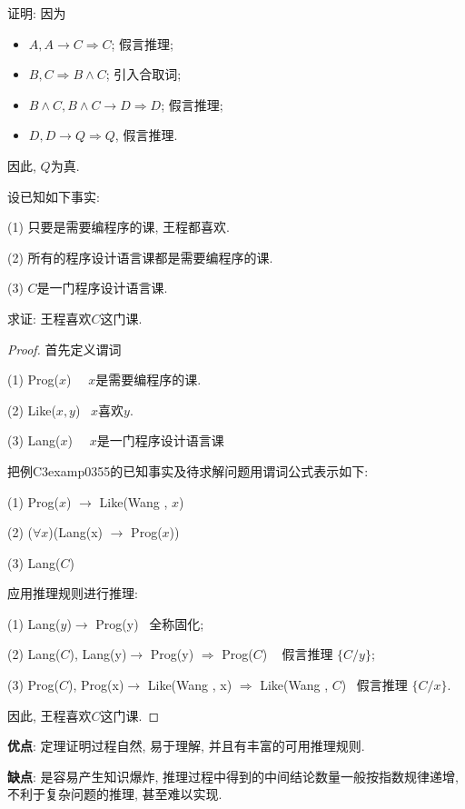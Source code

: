 证明: 因为
\begin{itemize}
    \item $A, A\rightarrow C\Rightarrow  C$;                    假言推理;
    \item $B,  C\Rightarrow  B\wedge C$;                        引入合取词;
    \item $B\wedge C, B\wedge C\rightarrow D \Rightarrow  D$;  假言推理;
    \item $D,  D\rightarrow Q \Rightarrow  Q$,                 假言推理.
\end{itemize}
因此, $Q$为真.
\begin{example}
设已知如下事实:

\quad   (1) 只要是需要编程序的课, 王程都喜欢.

\quad   (2) 所有的程序设计语言课都是需要编程序的课.

\quad   (3) $C$是一门程序设计语言课.

求证: 王程喜欢$C$这门课.
\end{example}

\begin{proof}
首先定义谓词

\quad   (1) Prog($x$)   \,\,\,\,    $x$是需要编程序的课.

\quad   (2) Like($x, y$)\,\,\,    $x$喜欢$y$.

\quad   (3) Lang($x$)   \,\,\,\,    $x$是一门程序设计语言课

把例{C3examp0355}的已知事实及待求解问题用谓词公式表示如下:

\quad   (1) Prog($x$) $\rightarrow$ Like(Wang , $x$)

\quad   (2) ($\forall x$)(Lang(x) $\rightarrow$ Prog($x$))

\quad   (3) Lang($C$)

应用推理规则进行推理:

\quad   (1) Lang($y$)$\rightarrow$ Prog(y)\qquad\qquad\qquad\,\,\,   全称固化;

\quad   (2) Lang($C$), Lang(y)$\rightarrow$ Prog(y) $\Rightarrow$  Prog($C$) \,\,\,  假言推理  $\{C/y\}$;

\quad   (3) Prog($C$),  Prog(x)$\rightarrow$ Like(Wang , x) $\Rightarrow$  Like(Wang , $C$)\,\,\,  假言推理 $ \{C/x\}$.

因此, 王程喜欢$C$这门课.
\end{proof}

\begin{remark}
\textcolor[rgb]{0,0,1}{\textbf{优点}}: 定理证明过程自然, 易于理解, 并且有丰富的可用推理规则.

\textcolor[rgb]{0,0,1}{\textbf{缺点}}: 是容易产生知识爆炸, 推理过程中得到的中间结论数量一般按指数规律递增, 不利于复杂问题的推理, 甚至难以实现.
\end{remark}
